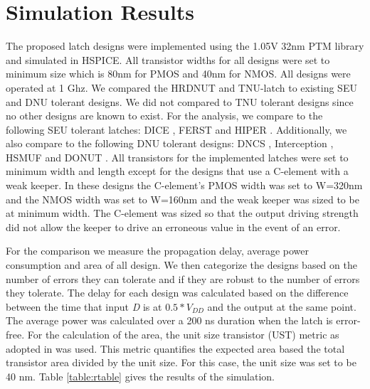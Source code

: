 \section{Simulation Results} \label{sec:res}

The proposed latch designs were implemented using the 1.05V 32nm PTM library \cite{PTM} and simulated in HSPICE. All transistor widths for all designs were set to minimum size which is 80nm for PMOS and 40nm for NMOS. All designs were operated at 1 Ghz. We compared the HRDNUT and TNU-latch to existing SEU and DNU tolerant designs. We did not compared to TNU tolerant designs since no other designs are known to exist. For the analysis, we compare to the following SEU tolerant latches: DICE \cite{DICE}, FERST \cite{FERST} and HIPER \cite{HIPER}. Additionally, we also compare to the following DNU tolerant designs: DNCS \cite{DNCS}, Interception \cite{Inter}, HSMUF \cite{HSMUF} and DONUT \cite{DONUT}. All transistors for the implemented latches were set to minimum width and length except for the designs that use a C-element with a weak keeper. In these designs the C-element's PMOS width was set to W=320nm and the NMOS width was set to W=160nm and the weak keeper was sized to be at minimum width. The C-element was sized so that the output driving strength did not allow the keeper to drive an erroneous value in the event of an error. 

For the comparison we measure the propagation delay, average power consumption and area of all design. We then categorize the designs based on the number of errors they can tolerate and if they are robust to the number of errors they tolerate. The delay for each design was calculated based on the difference between the time that input \textit{D} is at $0.5*V_{DD}$ and the output at the same point. The average power was calculated over a 200 ns duration when the latch is error-free. For the calculation of the area, the unit size transistor (UST) metric as adopted in \cite{DNCS} was used. This metric quantifies the expected area based the total transistor area divided by the unit size. For this case, the unit size was set to be 40 nm. Table \ref{table:rtable} gives the results of the simulation.

